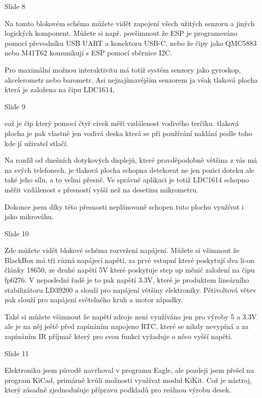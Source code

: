 
Slide 8

Na tomto blokovém schéma můžete vidět zapojení všech užitých senzoru a jiných logických komponent.
Můžete si např. povšimnout že ESP je programováno pomocí převodníku USB UART a konektoru USB-C,
nebo že čipy jako QMC5883 nebo M41T62 komunikují s ESP pomocí sběrnice I2C.

Pro maximální možnou interaktivitu má totiž systém senzory jako gyroskop, akcelerometr nebo barometr. 
Asi nejzajímavějším senzorem ja však tlaková plocha která je založena na čipu LDC1614, 


Slide 9

což je čip který 
pomocí čtyř cívek měří vzdálenost vodivého terčíku. tlaková plocha je pak vlastně 
jen vodivá deska která se při používání naklání podle toho kde jí uživatel stlačí. 

Na rozdíl od dnešních dotykových displejů,
které pravděpodobně většina z vás má na svých telefonech, je tlaková plocha schopna detekovat ne jen pozici doteku ale také jeho sílu,
a to velmi přesně. Ve správné aplikaci je totiž LDC1614 schopno měřit vzdálenost s přesností vyšší než na desetinu mikrometru.

Dokonce jsem díky této přesnosti neplánovaně schopen tuto plochu využívat i jako mikrováhu.


Slide 10

Zde můžete vidět blokové schéma rozvržení napájení.
Můžete si všimnout že BlackBox má tři různá napájecí napětí, za prvé vstupní které poskytují dva li-on články 18650, 
ze druhé napětí 5V které poskytuje step up měnič založení na čipu fp6276. V neposlední řadě je to pak napětí 3.3V,
které je produktem lineárního stabilizátoru LD39200 a slouží pro napájení většiny elektroniky.
Pětivoltová větev pak slouží pro napájení světelného kruh a motor západky.

Také si můžete všimnout že napětí zdroje není využíváno jen pro výroby 5 a 3.3V ale je na něj ještě před zapínáním 
napojeno RTC, které se nikdy nevypíná a za zapínáním IR příjmač který pro svou funkci vyžaduje o něco vyšší napětí.


Slide 11

Elektroniku jsem původě navrhoval v programu Eagle, ale pozdeji jsem přešel na program KiCad, primárně kvůli možnosti
využívat modul KiKit. Což je nástroj, který zásadně zjednodušuje přípravu podkladů pro reálnou výrobu desek. 


